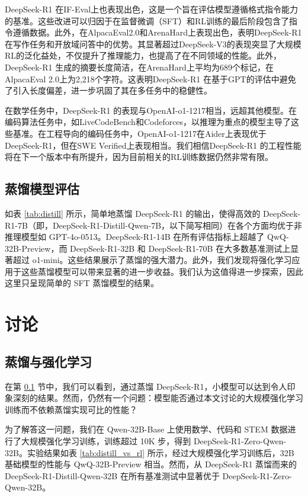 \documentclass[11pt, a4paper, logo, copyright, nonumbering]{deepseek}
\newcommand{\dsri}{DeepSeek-R1}
\begin{document}
\dsri{} 在IF-Eval上也表现出色，这是一个旨在评估模型遵循格式指令能力的基准。这些改进可以归因于在监督微调（SFT）和RL训练的最后阶段包含了指令遵循数据。此外，在AlpacaEval2.0和ArenaHard上表现出色，表明\dsri{} 在写作任务和开放域问答中的优势。其显著超过DeepSeek-V3的表现突显了大规模RL的泛化益处，不仅提升了推理能力，也提高了在不同领域的性能。此外，\dsri{} 生成的摘要长度简洁，在ArenaHard上平均为689个标记，在AlpacaEval 2.0上为2,218个字符。这表明\dsri{} 在基于GPT的评估中避免了引入长度偏差，进一步巩固了其在多任务中的稳健性。

在数学任务中，\dsri{} 的表现与OpenAI-o1-1217相当，远超其他模型。在编码算法任务中，如LiveCodeBench和Codeforces，以推理为重点的模型主导了这些基准。在工程导向的编码任务中，OpenAI-o1-1217在Aider上表现优于\dsri{}，但在SWE Verified上表现相当。我们相信\dsri{} 的工程性能将在下一个版本中有所提升，因为目前相关的RL训练数据仍然非常有限。
\subsection{蒸馏模型评估}
\label{sec:distilled_model_evaluation}


如表 \ref{tab:distill} 所示，简单地蒸馏 DeepSeek-R1 的输出，使得高效的 DeepSeek-R1-7B（即，DeepSeek-R1-Distill-Qwen-7B，以下简写相同）在各个方面均优于非推理模型如 GPT-4o-0513。DeepSeek-R1-14B 在所有评估指标上超越了 QwQ-32B-Preview，而 DeepSeek-R1-32B 和 DeepSeek-R1-70B 在大多数基准测试上显著超过 o1-mini。这些结果展示了蒸馏的强大潜力。此外，我们发现将强化学习应用于这些蒸馏模型可以带来显著的进一步收益。我们认为这值得进一步探索，因此这里只呈现简单的 SFT 蒸馏模型的结果。
\section{讨论}
\subsection{蒸馏与强化学习}


在第 \ref{sec:distilled_model_evaluation} 节中，我们可以看到，通过蒸馏 DeepSeek-R1，小模型可以达到令人印象深刻的结果。然而，仍然有一个问题：模型能否通过本文讨论的大规模强化学习训练而不依赖蒸馏实现可比的性能？

为了解答这一问题，我们在 Qwen-32B-Base 上使用数学、代码和 STEM 数据进行了大规模强化学习训练，训练超过 10K 步，得到 DeepSeek-R1-Zero-Qwen-32B。实验结果如表 \ref{tab:distill_vs_rl} 所示，经过大规模强化学习训练后，32B 基础模型的性能与 QwQ-32B-Preview 相当。然而，从 DeepSeek-R1 蒸馏而来的 DeepSeek-R1-Distill-Qwen-32B 在所有基准测试中显著优于 DeepSeek-R1-Zero-Qwen-32B。
\end{document}
